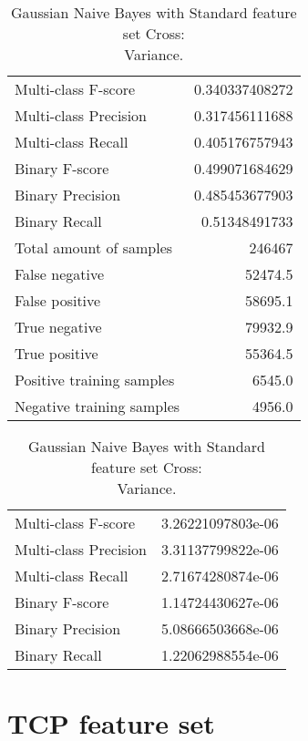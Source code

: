\begin{table}[H]
\begin{minipage}{0.5\textwidth}
\caption{Gaussian Naive Bayes with Standard feature set Cross: \\Average.}
\centering
\begin{tabular}{l r}
\toprule
Multi-class F-score & 0.340337408272 \\
Multi-class Precision & 0.317456111688 \\
Multi-class Recall & 0.405176757943 \\
\midrule
Binary F-score & 0.499071684629 \\
Binary Precision & 0.485453677903 \\
Binary Recall & 0.51348491733 \\
\midrule
Total amount of samples & 246467 \\
False negative & 52474.5 \\
False positive & 58695.1 \\
True negative & 79932.9 \\
True positive & 55364.5 \\
\midrule
Positive training samples & 6545.0 \\
Negative training samples & 4956.0 \\
\bottomrule
\end{tabular}
\end{minipage}
\hfillx
\begin{minipage}{0.5\textwidth}
\caption{Gaussian Naive Bayes with Standard feature set Cross: \\Variance.}
\centering
\begin{tabular}{l r}
\toprule
Multi-class F-score & 3.26221097803e-06 \\
Multi-class Precision & 3.31137799822e-06 \\
Multi-class Recall & 2.71674280874e-06 \\
\midrule
Binary F-score & 1.14724430627e-06 \\
Binary Precision & 5.08666503668e-06 \\
Binary Recall & 1.22062988554e-06 \\
\bottomrule
\end{tabular}
\end{minipage}
\end{table}

\newpage
\section{TCP feature set}
